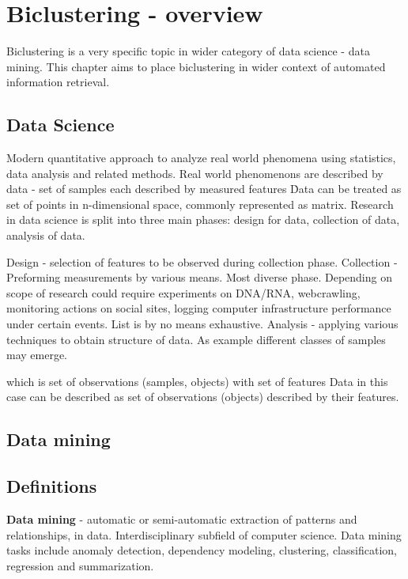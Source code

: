 \chapter{Biclustering - overview}
\label{cha:biclustering}
Biclustering is a very specific topic in wider category of data science - data mining. This chapter aims to place biclustering in wider context of automated information retrieval.

\section{Data Science}
Modern quantitative approach to analyze real world phenomena using statistics, data analysis and related methods. Real world phenomenons are described by data - set of samples each described by measured features \. Data can be treated as set of points in n-dimensional space, commonly represented as matrix. Research in data science is split into three main phases: design for data, collection of data, analysis of data. \cite[Ch.\ 2]{Hayashi1998}

Design - selection of features to be observed during collection phase.
Collection - Preforming measurements by various means. Most diverse phase. Depending on scope of research could require experiments on DNA/RNA, webcrawling, monitoring actions on social sites, logging computer infrastructure performance under certain events. List is by no means exhaustive.
Analysis - applying various techniques to obtain structure of data. As example different classes of samples may emerge.

which is set of observations (samples, objects) with set of features
Data in this case can be described as set of observations (objects) described by their features. 

\section{Data mining}



\section{Definitions}
\textbf{Data mining} - automatic or semi-automatic extraction of patterns and relationships, in data. Interdisciplinary subfield of computer science. Data mining tasks include anomaly detection, dependency modeling, clustering, classification, regression and summarization.

